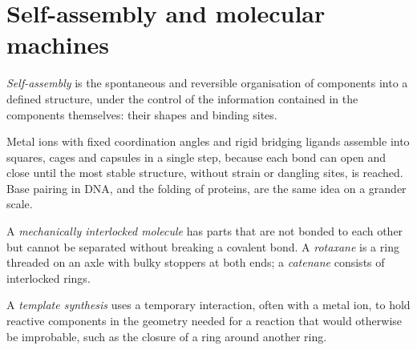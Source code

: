 \section{Self-assembly and molecular machines}

\begin{definition}\label{def:b3:supramolecular:self-assembly}
\emph{Self-assembly} is the spontaneous and reversible
organisation of components into a defined structure, under the control of the
information contained in the components themselves: their shapes and binding
sites.
\end{definition}

Metal ions with fixed coordination angles and rigid bridging ligands assemble
into squares, cages and capsules in a single step, because each bond can open
and close until the most stable structure, without strain or dangling sites,
is reached. Base pairing in DNA, and the folding of proteins, are the same idea
on a grander scale.

\begin{definition}\label{def:b3:supramolecular:interlocked}
A \emph{mechanically interlocked molecule}
has parts that are not bonded to each other but cannot be separated
without breaking a covalent bond. A \emph{rotaxane} is a ring
threaded on an axle with bulky stoppers at both ends; a
\emph{catenane} consists of interlocked rings.
\end{definition}

\begin{definition}\label{def:b3:supramolecular:template}
A \emph{template synthesis} uses a temporary
interaction, often with a metal ion, to hold reactive components in the
geometry needed for a reaction that would otherwise be improbable, such as the
closure of a ring around another ring.
\end{definition}

